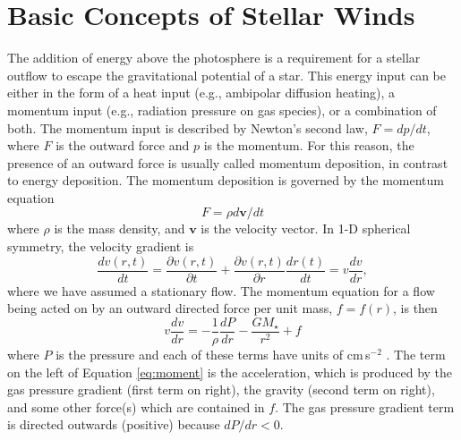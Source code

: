 \section{Basic Concepts of Stellar Winds}\label{sec:1.3}
The addition of energy above the photosphere is a requirement for a stellar outflow to escape the gravitational potential of a star. This energy input can be either in the form of a heat input (e.g., ambipolar diffusion heating),  a momentum input (e.g., radiation pressure on gas species), or a combination of both. The momentum input is described by Newton's second law, $F=dp/dt$, where $F$ is the outward force and $p$ is the momentum. For this reason, the presence of an outward force is usually called momentum deposition, in contrast to energy deposition. The momentum deposition is governed by the momentum equation
\begin{equation}
F=\rho d\pmb{v}/dt
\end{equation}
where $\rho$ is the mass density, and $\pmb{v}$ is the velocity vector. In 1-D spherical symmetry, the velocity gradient is
\begin{equation}
\dfrac{dv(r,t)}{dt}=\dfrac{\partial v(r,t)}{\partial t}+\dfrac{\partial v(r,t)}{\partial r}\dfrac{dr(t)}{dt}=v\frac{dv}{dr},
\end{equation}
where we have assumed a stationary flow. The momentum equation for a flow being acted on by an outward directed force per unit mass, $f=f(r)$, is then
\begin{equation}\label{eq:moment}
v\frac{dv}{dr}=-\frac{1}{\rho}\frac{dP}{dr}-\frac{GM_{\star}}{r^2}+f
\end{equation}
where $P$ is the pressure and each of these terms have units of cm\,s$^{-2}$ \citep[e.g.,][]{lamers_1999}. The term on the left of Equation \ref{eq:moment} is the acceleration, which is produced by the gas pressure gradient (first term on right), the gravity (second term on right), and some other force(s) which are contained in $f$. The gas pressure gradient term is directed outwards (positive) because $dP/dr < 0$. 


